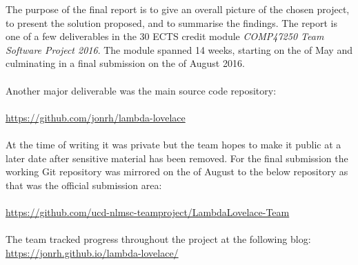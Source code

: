 \documentclass{article}
\begin{document}
The purpose of the final report is to give an overall picture of the chosen project, to present the solution proposed, and to summarise the findings. The report is one of a few deliverables in the 30 ECTS credit module \textit{COMP47250 Team Software Project 2016}. The module spanned 14 weeks, starting on the  of May and culminating in a final submission on the  of August 2016.
\\\\
Another major deliverable was the main source code repository:
\\\\
\url{https://github.com/jonrh/lambda-lovelace}
\\\\
At the time of writing it was private but the team hopes to make it public at a later date after sensitive material has been removed. For the final submission the working Git repository was mirrored on the  of August to the below repository as that was the official submission area:
\\\\
\url{https://github.com/ucd-nlmsc-teamproject/LambdaLovelace-Team}
\\\\
The team tracked progress throughout the project at the following blog: \\
\url{https://jonrh.github.io/lambda-lovelace/}


\clearpage


\tableofcontents
\clearpage


\end{document}
